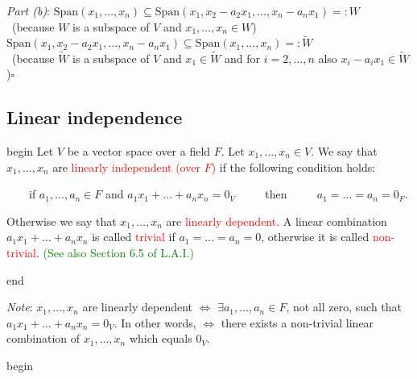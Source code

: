 \documentclass[
  12pt,
  a4paper,
  twoside]{article}
\theoremstyle{plain}
\theoremstyle{definition}
\begin{document}
\emph{Part (b)}: \(\mathrm{Span}(x_1, \dots, x_n) \subseteq \mathrm{Span}(x_1, x_2-a_2x_1, \dots, x_n-a_nx_1) =: W\)\\
\hspace*{0.333em}\hfill~{(because \(W\) is a subspace of \(V\) and \(x_1, \dots, x_n \in W\))}\\
\hspace*{0.333em}\hspace*{0.333em}\hspace*{0.333em}\hspace*{0.333em} \(\mathrm{Span}(x_1, x_2-a_2x_1, \dots, x_n-a_nx_1) \subseteq \mathrm{Span}(x_1, \dots, x_n) =: \widetilde{W}\)\\
\hspace*{0.333em}\hfill~{(because \(\widetilde{W}\) is a subspace of \(V\) and \(x_1\in \widetilde{W}\) and for \(i=2,\dots,n\) also \(x_i-a_ix_1 \in \widetilde{W}\))\(\square\)}

\hypertarget{ss-lin-indep}{%
\subsection{Linear independence}\label{ss-lin-indep}}

\csname begin\label{cnj:defn-lin-indep}
Let \(V\) be a vector space over a field \(F\).
Let \(x_1, \dots, x_n \in V\).
We say that \(x_1, \dots, x_n\) are \textcolor{red}{linearly independent (over $F$)} if the following condition holds:

~~~~if \(a_1, \dots, a_n \in F\) and \(a_1x_1 + \dots + a_nx_n = 0_V\) ~~~~ then ~~~~ \(a_1 = \dots = a_n = 0_F\).

Otherwise we say that \(x_1, \dots, x_n\) are \textcolor{red}{linearly dependent}.
A linear combination \(a_1x_1+\dots+a_nx_n\) is called \textcolor{red}{trivial} if \(a_1=\dots=a_n=0\), otherwise it is called \textcolor{red}{non-trivial}.
\textcolor{green}{(See also Section 6.5 of L.A.I.)}

\csname end

\emph{Note}:
\(x_1,\dots,x_n\) are linearly dependent \(\iff\) \(\exists a_1,\dots,a_n\in F\), not all zero, such that \(a_1x_1+\dots+a_nx_n=0_V\).
In other words, \(\iff\) there exists a non-trivial linear combination of \(x_1,\dots,x_n\) which equals \(0_V\).

\csname begin\label{cnj:expl-lin-indep}
\end{document}
